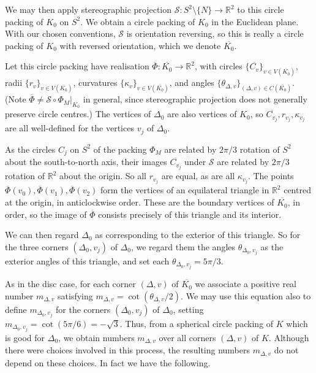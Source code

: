 \documentclass[12pt]{amsart}
\numberwithin{equation}{section}
\theoremstyle{named}
\newcommand{\R}{\mathbb{R}}
\newcommand{\To}{\longrightarrow}
\begin{document}
We may then apply stereographic projection $\mathcal{S} \colon S^2 \setminus \{N\} \To \R^2$ to this circle packing of $K_0$ on $S^2$. We obtain a circle packing of $K_0$ in the Euclidean plane. With our chosen conventions, $\mathcal{S}$ is orientation reversing, so this is really a circle packing of $K_0$ with reversed orientation, which we denote $\overline{K_0}$. 

Let this circle packing have realisation $\overline{\Phi} \colon \overline{K_0} \To \R^2$, with circles $\{\overline{C_v}\}_{v \in V(\overline{K_0})}$, radii $\{r_v\}_{v \in V(\overline{K_0})}$, curvatures $\{\kappa_v\}_{v \in V(\overline{K_0})}$, and angles $\{\theta_{\Delta,v}\}_{(\Delta,v) \in C(\overline{K_0})}$. (Note $\overline{\Phi} \neq \mathcal{S} \circ \Phi_M|_{K_0}$ in general, since stereographic projection does not generally preserve circle centres.) The vertices of $\Delta_0$ are also vertices of $K_0$, so $\overline{C_{v_j}}, r_{v_j}, \kappa_{v_j}$ are all well-defined for the vertices $v_j$ of $\Delta_0$. 

As the circles $C_j$ on $S^2$ of the packing $\Phi_M$ are related by $2\pi/3$ rotation of $S^2$ about the south-to-north axis, their images $\overline{C_{v_j}}$ under $\mathcal{S}$ are related by $2\pi/3$ rotation of $\R^2$ about the origin. So all $r_{v_j}$ are equal, as are all $\kappa_{v_j}$. The points $\overline{\Phi} (v_0), \overline{\Phi} (v_1), \overline{\Phi} (v_2)$ form the vertices of an equilateral triangle in $\R^2$ centred at the origin, in anticlockwise order. These are the boundary vertices of $\overline{K_0}$, in order, so the image of $\overline{\Phi}$ consists precisely of this triangle and its interior.

We can then regard $\Delta_0$ as corresponding to the exterior of this triangle. So for the three corners $(\Delta_0, v_j)$ of $\Delta_0$, we regard them the angles $\theta_{\Delta_0, v_j}$ as the exterior angles of this triangle, and set each $\theta_{\Delta_0, v_j} = 5\pi/3$. 

As in the disc case, for each corner $(\Delta, v)$ of $\overline{K_0}$ we associate a positive real number $m_{\Delta,v}$ satisfying $m_{\Delta,v} = \cot \left( \theta_{\Delta,v}/2 \right)$. We may use this equation also to define $m_{\Delta_0,v_j}$ for the corners $(\Delta_0,v_j)$ of $\Delta_0$, setting $m_{\Delta_0,v_j} = \cot \left( 5\pi/6 \right) = - \sqrt{3}$. 
Thus, from a spherical circle packing of $K$ which is good for $\Delta_0$, we obtain numbers $m_{\Delta,v}$ over all corners $(\Delta,v)$ of $K$. Although there were choices involved in this process, the resulting numbers $m_{\Delta,v}$ do not depend on these choices. In fact we have the following.
\end{document}
